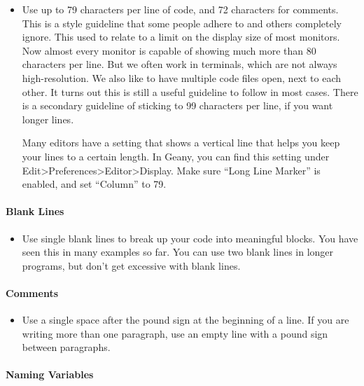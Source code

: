 \documentclass[11pt]{article}
\providecommand{\tightlist}{%
      \setlength{\itemsep}{0pt}\setlength{\parskip}{0pt}}
\begin{document}
\begin{itemize}
\item
  Use up to 79 characters per line of code, and 72 characters for
  comments. This is a style guideline that some people adhere to and
  others completely ignore. This used to relate to a limit on the
  display size of most monitors. Now almost every monitor is capable of
  showing much more than 80 characters per line. But we often work in
  terminals, which are not always high-resolution. We also like to have
  multiple code files open, next to each other. It turns out this is
  still a useful guideline to follow in most cases. There is a secondary
  guideline of sticking to 99 characters per line, if you want longer
  lines.

  Many editors have a setting that shows a vertical line that helps you
  keep your lines to a certain length. In Geany, you can find this
  setting under
  Edit\textgreater Preferences\textgreater Editor\textgreater Display.
  Make sure ``Long Line Marker'' is enabled, and set ``Column'' to 79.
\end{itemize}

\hypertarget{blank-lines}{%
\paragraph{Blank Lines}\label{blank-lines}}

\begin{itemize}
\tightlist
\item
  Use single blank lines to break up your code into meaningful blocks.
  You have seen this in many examples so far. You can use two blank
  lines in longer programs, but don't get excessive with blank lines.
\end{itemize}

\hypertarget{comments}{%
\paragraph{Comments}\label{comments}}

\begin{itemize}
\tightlist
\item
  Use a single space after the pound sign at the beginning of a line. If
  you are writing more than one paragraph, use an empty line with a
  pound sign between paragraphs.
\end{itemize}

\hypertarget{naming-variables}{%
\paragraph{Naming Variables}\label{naming-variables}}
\end{document}

